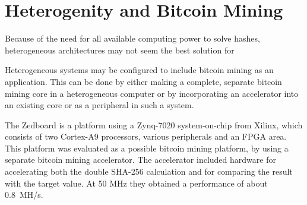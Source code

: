 \section{Heterogenity and Bitcoin Mining}

Because of the need for all available computing power to solve hashes, heterogeneous architectures
may not seem the best solution for 

Heterogeneous systems may be configured to include bitcoin mining as an application. This can be
done by either making a complete, separate bitcoin mining core in a heterogeneous computer
or by incorporating an accelerator into an existing core or as a peripheral in such a system.

The Zedboard is a platform using a Zynq-7020 system-on-chip from Xilinx, which consists of
two Cortex-A9 processors, various peripherals and an FPGA area. This platform was evaluated
as a possible bitcoin mining platform, by using a separate bitcoin mining
accelerator. The accelerator included hardware for accelerating both the double SHA-256 calculation
and for comparing the result with the target value. At 50 MHz they obtained a performance of about
0.8~MH/s. \cite{xcell-bitcoin,standridge-master}

